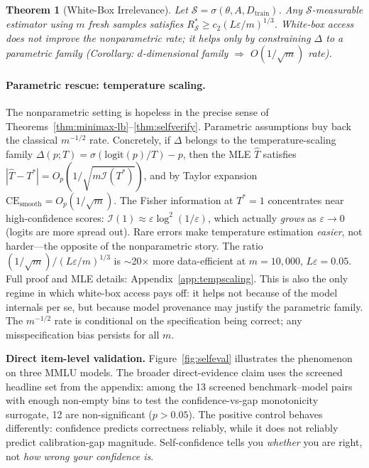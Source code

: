 \documentclass{article}
\newcommand{\CE}{\mathrm{CE}}
\newcommand{\cS}{\mathcal{S}}
\newcommand{\Lip}{L}
\newcommand{\errrate}{\varepsilon}
\newcommand{\nsamples}{m}
\newcommand{\calmap}{\Delta}
\newcommand{\FisherI}{\mathcal{I}}
\newcommand{\logit}{\mathrm{logit}}
\providecommand{\sigmoid}{}
\renewcommand{\sigmoid}{\sigma}
\newtheorem{theorem}{Theorem}
\theoremstyle{definition}
\begin{document}
\begin{theorem}[White-Box Irrelevance]
\label{thm:whitebox}
Let $\cS = \sigma(\theta, A, D_{\mathrm{train}})$. Any $\cS$-measurable estimator using $\nsamples$ fresh samples satisfies $R^*_\cS \geq c_2(\Lip\errrate/\nsamples)^{1/3}$. White-box access does not improve the nonparametric rate; it helps only by constraining $\calmap$ to a parametric family (Corollary: $d$-dimensional family $\Rightarrow$ $O(1/\sqrt{\nsamples})$ rate).
\end{theorem}

\paragraph{Parametric rescue: temperature scaling.} The nonparametric setting is hopeless in the precise sense of Theorems~\ref{thm:minimax-lb}--\ref{thm:selfverify}. Parametric assumptions buy back the classical $\nsamples^{-1/2}$ rate. Concretely, if $\calmap$ belongs to the temperature-scaling family $\calmap(p;T) = \sigmoid(\logit(p)/T) - p$, then the MLE $\hat T$ satisfies $|\hat T - T^*| = O_p(1/\sqrt{\nsamples \FisherI(T^*)})$, and by Taylor expansion $\CE_{\mathrm{smooth}} = O_p(1/\sqrt{\nsamples})$. The Fisher information at $T^* = 1$ concentrates near high-confidence scores: $\FisherI(1) \approx \errrate \log^2(1/\errrate)$, which actually \emph{grows} as $\errrate \to 0$ (logits are more spread out). Rare errors make temperature estimation \emph{easier}, not harder---the opposite of the nonparametric story. The ratio $(1/\sqrt{\nsamples}) / (\Lip\errrate/\nsamples)^{1/3}$ is $\sim$20$\times$ more data-efficient at $\nsamples{=}10{,}000$, $\Lip\errrate{=}0.05$. Full proof and MLE details: Appendix~\ref{app:tempscaling}. This is also the only regime in which white-box access pays off: it helps not because of the model internals per se, but because model provenance may justify the parametric family. The $\nsamples^{-1/2}$ rate is conditional on the specification being correct; any misspecification bias persists for all $\nsamples$.

\textbf{Direct item-level validation.} Figure~\ref{fig:selfeval} illustrates the phenomenon on three MMLU models. The broader direct-evidence claim uses the screened headline set from the appendix: among the 13 screened benchmark--model pairs with enough non-empty bins to test the confidence-vs-gap monotonicity surrogate, 12 are non-significant ($p > 0.05$). The positive control behaves differently: confidence predicts correctness reliably, while it does not reliably predict calibration-gap magnitude. Self-confidence tells you \emph{whether} you are right, not \emph{how wrong your confidence is}.
\end{document}
